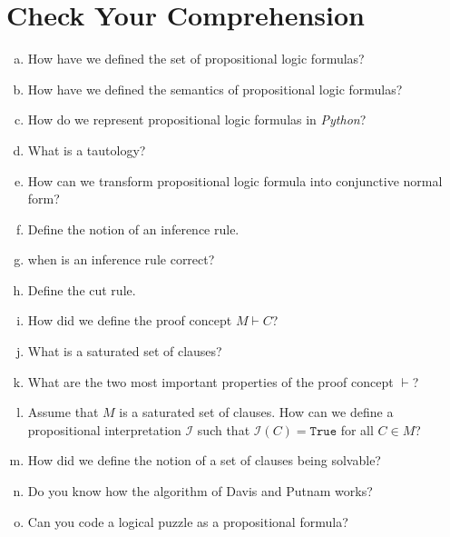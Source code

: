 \section{Check Your Comprehension}
\begin{enumerate}[(a)]
\item How have we defined the set of propositional logic formulas?
\item How have we defined the semantics of propositional logic formulas?
\item How do we represent propositional logic formulas in \textsl{Python}?
\item What is a tautology?
\item How can we transform propositional logic formula into conjunctive normal
      form?
\item Define the notion of an inference rule.
\item when is  an inference rule correct?
\item Define the cut rule.
\item How did we define the proof concept $M \vdash C$?
\item What is a saturated set of clauses?
\item What are the two most important properties of the proof concept $\vdash$?
\item Assume that $M$ is a saturated set of clauses. How can we define a propositional interpretation
      $\mathcal{I}$ such that $\mathcal{I}(C) = \mathtt{True}$ for all $C \in M$?
\item How did we define the notion of a set of clauses being solvable?
\item Do you know how the algorithm of Davis and Putnam works?
\item Can you code a logical puzzle as a propositional formula?
\end{enumerate}


%

